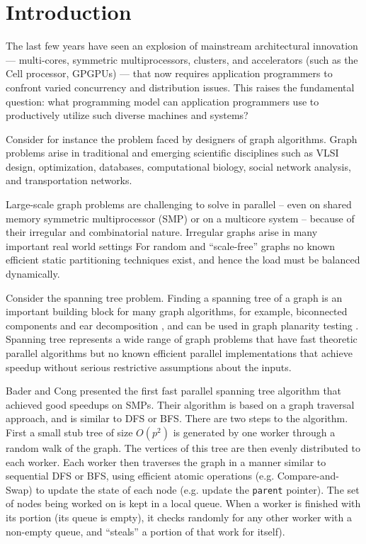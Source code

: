
\section{Introduction}
\label{s:intr}\label{sec:intro}

The last few years have seen an explosion of mainstream architectural
innovation --- multi-cores, symmetric multiprocessors, clusters, and
accelerators (such as the Cell processor, GPGPUs) --- that now
requires application programmers to confront varied concurrency and
distribution issues. This raises the fundamental question: what
programming model can application programmers use to productively utilize
such diverse machines and systems?

Consider for instance the problem faced by designers of graph
algorithms.  Graph problems arise in traditional and
emerging scientific disciplines such as VLSI design, optimization,
databases, computational biology, social network analysis, and
transportation networks.

Large-scale graph problems are challenging to solve in parallel --
even on shared memory symmetric multiprocessor (SMP) or on a multicore
system -- because of their irregular and combinatorial nature.
Irregular graphs arise in many important real world settings For
random and ``scale-free'' graphs \cite{CZF04} no known efficient
static partitioning techniques exist, and hence the load must be
balanced dynamically.  

Consider the spanning tree problem. Finding a spanning tree of a graph
is an important building block for many graph algorithms, for example,
biconnected components and ear decomposition \cite{MR86}, and can be
used in graph planarity testing \cite{KR88}.  Spanning tree represents
a wide range of graph problems that have fast theoretic parallel
algorithms but no known efficient parallel implementations that
achieve speedup without serious restrictive assumptions about the
inputs.

Bader and Cong \cite{BC04a} presented the first fast parallel spanning
tree algorithm that achieved good speedups on SMPs. Their algorithm is
based on a graph traversal approach, and is similar to DFS or BFS.
There are two steps to the algorithm. First a small stub tree of size
$O(p^2)$ is generated by one worker through a random walk of the
graph. The vertices of this tree are then evenly distributed to each
worker.  Each worker then traverses the graph in a manner similar to
sequential DFS or BFS, using efficient atomic operations (e.g.{}
Compare-and-Swap) to update the state of each node (e.g.{} update the
{\tt parent} pointer). The set of nodes being worked on is kept in a
local queue.  When a worker is finished with its portion (its queue is
empty), it checks randomly for any other worker with a non-empty
queue, and ``steals'' a portion of that work for itself).

